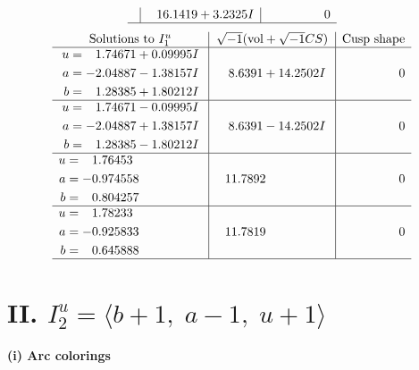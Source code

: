\documentclass[1p]{elsarticle_modified}
\theoremstyle{definition}
\newcommand{\I}{\sqrt{-1}}
\begin{document}
$$\begin{array}{c|c|c}
 & \phantom{-}16.1419 + 3.2325 I & \phantom{-0.000000 } 0\\
 \hline 
 \end{array}$$\newpage$$\begin{array}{c|c|c}  
\text{Solutions to }I^u_{1}& \I (\text{vol} + \sqrt{-1}CS) & \text{Cusp shape}\\
 \hline 
\begin{aligned}
u &= \phantom{-}1.74671 + 0.09995 I \\
a &= -2.04887 - 1.38157 I \\
b &= \phantom{-}1.28385 + 1.80212 I\end{aligned}
 & \phantom{-}8.6391 + 14.2502 I & \phantom{-0.000000 } 0 \\ \hline\begin{aligned}
u &= \phantom{-}1.74671 - 0.09995 I \\
a &= -2.04887 + 1.38157 I \\
b &= \phantom{-}1.28385 - 1.80212 I\end{aligned}
 & \phantom{-}8.6391 - 14.2502 I & \phantom{-0.000000 } 0 \\ \hline\begin{aligned}
u &= \phantom{-}1.76453\phantom{ +0.000000I} \\
a &= -0.974558\phantom{ +0.000000I} \\
b &= \phantom{-}0.804257\phantom{ +0.000000I}\end{aligned}
 & \phantom{-}11.7892\phantom{ +0.000000I} & \phantom{-0.000000 } 0 \\ \hline\begin{aligned}
u &= \phantom{-}1.78233\phantom{ +0.000000I} \\
a &= -0.925833\phantom{ +0.000000I} \\
b &= \phantom{-}0.645888\phantom{ +0.000000I}\end{aligned}
 & \phantom{-}11.7819\phantom{ +0.000000I} & \phantom{-0.000000 } 0\\
 \hline 
 \end{array}$$\newpage\newpage\renewcommand{\arraystretch}{1}
\centering \section*{II. $I^u_{2}= \langle b+1,\;a-1,\;u+1 \rangle$}
\flushleft \textbf{(i) Arc colorings}\\
\end{document}
